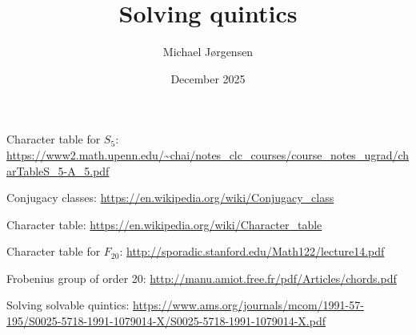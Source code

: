 \documentclass[12pt,oneside,a4paper]{article}
\title{Solving quintics}
\date{December 2025}
\author{Michael Jørgensen}
\begin{document}
\maketitle

Character table for $S_5$:
\url{https://www2.math.upenn.edu/~chai/notes_clc_courses/course_notes_ugrad/charTableS_5-A_5.pdf}

Conjugacy classes:
\url{https://en.wikipedia.org/wiki/Conjugacy_class}

Character table:
\url{https://en.wikipedia.org/wiki/Character_table}

Character table for $F_{20}$:
\url{http://sporadic.stanford.edu/Math122/lecture14.pdf}

Frobenius group of order 20:
\url{http://manu.amiot.free.fr/pdf/Articles/chords.pdf}

Solving solvable quintics:
\url{https://www.ams.org/journals/mcom/1991-57-195/S0025-5718-1991-1079014-X/S0025-5718-1991-1079014-X.pdf}
\end{document}
